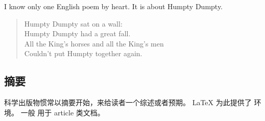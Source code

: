 \begin{example}
I know only one English poem by
heart. It is about Humpty Dumpty.
\begin{flushleft}
\begin{verse}
Humpty Dumpty sat on a wall:\\
Humpty Dumpty had a great fall.\\
All the King's horses and all
the King's men\\
Couldn't put Humpty together
again.
\end{verse}
\end{flushleft}
\end{example}

\subsection{摘要}

科学出版物惯常以摘要开始，来给读者一个综述或者预期。
\LaTeX{} 为此提供了  环境。
一般  用于 article 类文档。

